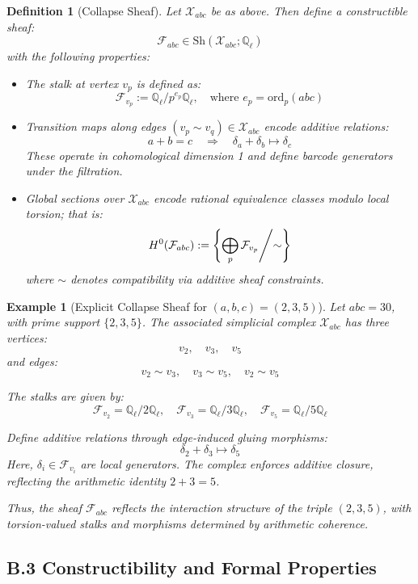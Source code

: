 \documentclass[11pt]{article}
\newtheorem{definition}[theorem]{Definition}
\newtheorem{example}[theorem]{Example}
\begin{document}
\begin{definition}[Collapse Sheaf]
Let \( \mathcal{X}_{abc} \) be as above. Then define a constructible sheaf:
\[
\mathcal{F}_{abc} \in \mathrm{Sh}(\mathcal{X}_{abc}; \mathbb{Q}_\ell)
\]
with the following properties:
\begin{itemize}
  \item The stalk at vertex \( v_p \) is defined as:
  \[
  \mathcal{F}_{v_p} := \mathbb{Q}_\ell / p^{e_p} \mathbb{Q}_\ell, \quad \text{where } e_p = \mathrm{ord}_p(abc)
  \]
  \item Transition maps along edges \( (v_p \sim v_q) \in \mathcal{X}_{abc} \) encode additive relations:
  \[
  a + b = c \quad \Rightarrow \quad \delta_a + \delta_b \mapsto \delta_c
  \]
  These operate in cohomological dimension 1 and define barcode generators under the filtration.
  \item Global sections over \( \mathcal{X}_{abc} \) encode rational equivalence classes modulo local torsion; that is:
  \[
  H^0(\mathcal{F}_{abc}) := \left\{ \bigoplus_{p} \mathcal{F}_{v_p} \middle/ \sim \right\}
  \]
  where \( \sim \) denotes compatibility via additive sheaf constraints.
\end{itemize}
\end{definition}

\begin{example}[Explicit Collapse Sheaf for \( (a,b,c) = (2,3,5) \)]
Let \( abc = 30 \), with prime support \( \{2,3,5\} \).  
The associated simplicial complex \( \mathcal{X}_{abc} \) has three vertices:
\[
v_2, \quad v_3, \quad v_5
\]
and edges:
\[
v_2 \sim v_3, \quad v_3 \sim v_5, \quad v_2 \sim v_5
\]

The stalks are given by:
\[
\mathcal{F}_{v_2} = \mathbb{Q}_\ell / 2 \mathbb{Q}_\ell, \quad
\mathcal{F}_{v_3} = \mathbb{Q}_\ell / 3 \mathbb{Q}_\ell, \quad
\mathcal{F}_{v_5} = \mathbb{Q}_\ell / 5 \mathbb{Q}_\ell
\]

Define additive relations through edge-induced gluing morphisms:
\[
\delta_{2} + \delta_{3} \mapsto \delta_{5}
\]
Here, \( \delta_i \in \mathcal{F}_{v_i} \) are local generators.  
The complex enforces additive closure, reflecting the arithmetic identity \( 2 + 3 = 5 \).

Thus, the sheaf \( \mathcal{F}_{abc} \) reflects the interaction structure of the triple \((2,3,5)\),  
with torsion-valued stalks and morphisms determined by arithmetic coherence.
\end{example}


\subsection*{B.3 Constructibility and Formal Properties}
\end{document}
